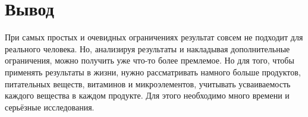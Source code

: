 \documentclass[]{article}
\begin{document}
\section{Вывод}
При самых простых и очевидных ограничениях результат совсем не подходит для
реального человека. Но, анализируя результаты и накладывая дополнительные
ограничения, можно получить уже что-то более премлемое. Но для того, чтобы
применять результаты в жизни, нужно рассматривать намного больше продуктов,
питательных веществ, витаминов и микроэлементов, учитывать усваиваемость
каждого вещества в каждом продукте. Для этого необходимо много времени и
серьёзные исследования.
\end{document}
